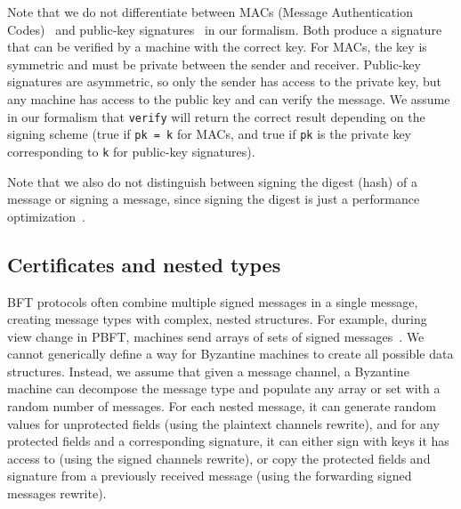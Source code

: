 Note that we do not differentiate between MACs (Message Authentication Codes)~\cite{MAC} and public-key signatures~\cite{signature} in our formalism.
Both produce a signature that can be verified by a machine with the correct key.
For MACs, the key is symmetric and must be private between the sender and receiver.
Public-key signatures are asymmetric, so only the sender has access to the private key, but any machine has access to the public key and can verify the message.
We assume in our formalism that \texttt{verify} will return the correct result depending on the signing scheme (true if \texttt{pk = k} for MACs, and true if \texttt{pk} is the private key corresponding to \texttt{k} for public-key signatures). 

Note that we also do not distinguish between signing the digest (hash) of a message or signing a message, since signing the digest is just a performance optimization~\cite{pbft}.


\subsection{Certificates and nested types}
\label{sec:certificate-channels-formalism}
BFT protocols often combine multiple signed messages in a single message, creating message types with complex, nested structures.
For example, during view change in PBFT, machines send arrays of sets of signed messages~\cite{pbft}.
We cannot generically define a way for Byzantine machines to create all possible data structures.
Instead, we assume that given a message channel, a Byzantine machine can decompose the message type and populate any array or set with a random number of messages. 
For each nested message, it can generate random values for unprotected fields (using the plaintext channels rewrite), and for any protected fields and a corresponding signature, it can either sign with keys it has access to (using the signed channels rewrite), or copy the protected fields and signature from a previously received message (using the forwarding signed messages rewrite).
